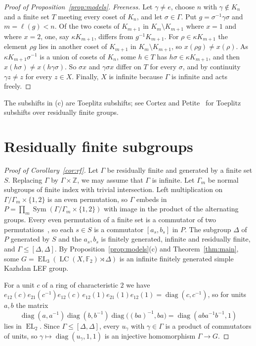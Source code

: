 \documentclass[11pt]{amsart}
\newcommand{\F}{\mathbb F}
\newcommand{\Z}{\mathbb Z}
\newcommand{\LC}{\operatorname{LC}}
\newcommand{\EL}{\operatorname{EL}}
\newcommand{\Sym}{\operatorname{Sym}}
\newcommand{\diag}{\operatorname{diag}}
\begin{document}
\begin{proof}[Proof of Proposition~\ref{prop:models}]
\emph{Freeness.} Let $\gamma\ne e$, choose $n$ with $\gamma\notin K_n$ and a
finite set $T$ meeting every coset of $K_n$, and let $\sigma\in\Gamma$. Put
$g=\sigma^{-1}\gamma\sigma$ and $m=\ell(g)<n$. Of the two cosets of $K_{m+1}$
in $K_m\setminus K_{m+1}$ where $x=1$ and where $x=2$, one, say
$\kappa K_{m+1}$, differs from $g^{-1}K_{m+1}$. For $\rho\in\kappa K_{m+1}$
the element $\rho g$ lies in another coset of $K_{m+1}$ in
$K_m\setminus K_{m+1}$, so $x(\rho g)\ne x(\rho)$. As $\kappa K_{m+1}\sigma^{-1}$
is a union of cosets of $K_n$, some $h\in T$ has $h\sigma\in\kappa K_{m+1}$,
and then $x(h\sigma)\ne x(h\gamma\sigma)$. So $\sigma x$ and $\gamma\sigma x$
differ on $T$ for every $\sigma$, and by continuity $\gamma z\ne z$ for
every $z\in X$. Finally, $X$ is infinite because $\Gamma$ is infinite and
acts freely.
\end{proof}

The subshifts in (c) are Toeplitz subshifts; see Cortez and
Petite~\cite{CortezPetite} for Toeplitz subshifts over residually finite
groups.

\section{Residually finite subgroups}

\begin{proof}[Proof of Corollary~\ref{cor:rf}]
Let $\Gamma$ be residually finite and generated by a finite set $S$.
Replacing $\Gamma$ by $\Gamma\times\Z$, we may assume that $\Gamma$ is
infinite. Let $\Gamma_m$ be normal subgroups of finite index with trivial
intersection. Left multiplication on $\Gamma/\Gamma_m\times\{1,2\}$ is an
even permutation, so $\Gamma$ embeds in
$P=\prod_m\Sym(\Gamma/\Gamma_m\times\{1,2\})$ with image in the product of
the alternating groups. Every even permutation of a finite set is a
commutator of two permutations~\cite[Theorem~1]{Ore}, so each $s\in S$ is
a commutator $[a_s,b_s]$ in $P$. The subgroup $\Delta$ of $P$ generated by
$S$ and the $a_s,b_s$ is finitely generated, infinite and residually
finite, and $\Gamma\le[\Delta,\Delta]$. By Proposition~\ref{prop:models}(c)
and Theorem~\ref{thm:main}, some $G=\EL_3(\LC(X,\F_2)\rtimes\Delta)$ is an
infinite finitely generated simple Kazhdan LEF group.

For a unit $c$ of a ring of characteristic $2$ we have
$e_{12}(c)e_{21}(c^{-1})e_{12}(c)\,e_{12}(1)e_{21}(1)e_{12}(1)=\diag(c,c^{-1})$,
so for units $a,b$ the matrix
\[
 \diag(a,a^{-1})\diag(b,b^{-1})\diag\bigl((ba)^{-1},ba\bigr)
 =\diag(aba^{-1}b^{-1},1)
\]
lies in $\EL_2$. Since $\Gamma\le[\Delta,\Delta]$, every $u_\gamma$ with
$\gamma\in\Gamma$ is a product of commutators of units, so
$\gamma\mapsto\diag(u_\gamma,1,1)$ is an injective homomorphism
$\Gamma\to G$.
\end{proof}
\end{document}

